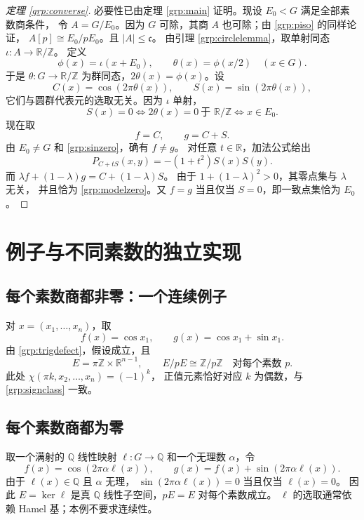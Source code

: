 \documentclass[11pt,a4paper,oneside,openany]{book}
\theoremstyle{lecture}
\newcommand{\Q}{\mathbb Q}
\newcommand{\R}{\mathbb R}
\newcommand{\Z}{\mathbb Z}
\newcommand{\Circle}{\mathbb R/\mathbb Z}
\newcommand{\cfrak}{\mathfrak c}
\numberwithin{equation}{section}
\begin{document}
\begin{proof}[定理 \ref{grp:converse}]
必要性已由定理 \ref{grp:main} 证明。现设 $E_0<G$ 满足全部素数商条件，
令 $A=G/E_0$。因为 $G$ 可除，其商 $A$ 也可除；由
\eqref{grp:piso} 的同样论证，
$A[p]\cong E_0/pE_0$。且 $\lvert A\rvert\le\cfrak$。
由引理 \ref{grp:circlelemma}，取单射同态 $\iota:A\to\Circle$。
定义
\[
 \phi(x)=\iota(x+E_0),\qquad
 \theta(x)=\phi(x/2)\quad(x\in G).
\]
于是 $\theta:G\to\Circle$ 为群同态，$2\theta(x)=\phi(x)$。设
\[
 C(x)=\cos(2\pi\theta(x)),\qquad
 S(x)=\sin(2\pi\theta(x)),
\]
它们与圆群代表元的选取无关。因为 $\iota$ 单射，
\begin{equation}\label{grp:sinzero}
 S(x)=0
 \iff 2\theta(x)=0\ \text{于 }\Circle
 \iff x\in E_0.
\end{equation}
现在取
\[
 f=C,\qquad g=C+S.
\]
由 $E_0\ne G$ 和 \eqref{grp:sinzero}，确有 $f\ne g$。
对任意 $t\in\R$，加法公式给出
\begin{equation}\label{grp:trigdefect}
 P_{C+tS}(x,y)=-(1+t^2)S(x)S(y).
\end{equation}
而 $\lambda f+(1-\lambda)g=C+(1-\lambda)S$。
由于 $1+(1-\lambda)^2>0$，其零点集与 $\lambda$ 无关，
并且恰为 \eqref{grp:modelzero}。又 $f=g$ 当且仅当 $S=0$，即一致点集恰为 $E_0$。
\end{proof}

\section{例子与不同素数的独立实现}\label{grp:independencesection}

\subsection{每个素数商都非零：一个连续例子}
对 $x=(x_1,\ldots,x_n)$，取
\[
 f(x)=\cos x_1,\qquad g(x)=\cos x_1+\sin x_1.
\]
由 \eqref{grp:trigdefect}，假设成立，且
\[
 E=\pi\Z\times\R^{n-1},\qquad
 E/pE\cong\Z/p\Z\quad\text{对每个素数 }p.
\]
此处 $\chi(\pi k,x_2,\ldots,x_n)=(-1)^k$，
正值元素恰好对应 $k$ 为偶数，与 \eqref{grp:signclass} 一致。

\subsection{每个素数商都为零}
取一个满射的 $\Q$ 线性映射 $\ell:G\to\Q$ 和一个无理数 $\alpha$，令
\[
 f(x)=\cos(2\pi\alpha\ell(x)),\qquad
 g(x)=f(x)+\sin(2\pi\alpha\ell(x)).
\]
由于 $\ell(x)\in\Q$ 且 $\alpha$ 无理，
$\sin(2\pi\alpha\ell(x))=0$ 当且仅当 $\ell(x)=0$。
因此 $E=\ker\ell$ 是真 $\Q$ 线性子空间，$pE=E$ 对每个素数成立。
$\ell$ 的选取通常依赖 Hamel 基；本例不要求连续性。
\end{document}
